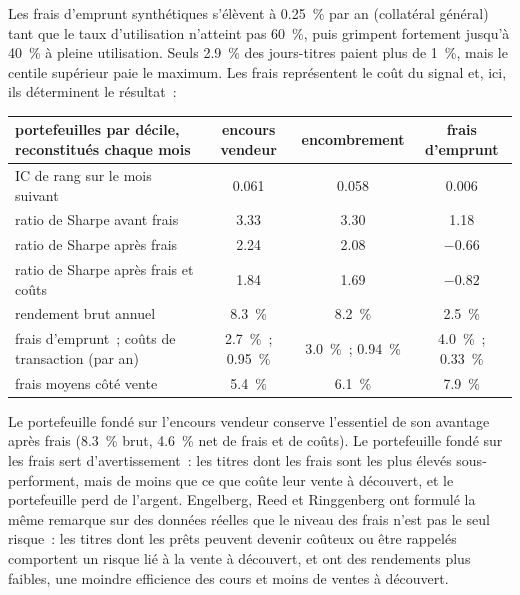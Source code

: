 Les frais d'emprunt synthétiques s'élèvent à 0.25~\% par an (collatéral général) tant que le taux d'utilisation n'atteint pas 60~\%, puis grimpent fortement jusqu'à 40~\% à pleine utilisation. Seuls 2.9~\% des
jours-titres paient plus de 1~\%, mais le centile supérieur paie le maximum. Les frais représentent le coût du signal et, ici, ils déterminent le résultat~:

\begin{center}
\small
\begin{tabular}{@{}lccc@{}}
\toprule
portefeuilles par décile, reconstitués chaque mois & encours vendeur & encombrement & frais d'emprunt\\
\midrule
IC de rang sur le mois suivant & 0.061 & 0.058 & 0.006\\
ratio de Sharpe avant frais & 3.33 & 3.30 & 1.18\\
ratio de Sharpe après frais & 2.24 & 2.08 & $-0.66$\\
ratio de Sharpe après frais et coûts & 1.84 & 1.69 & $-0.82$\\
rendement brut annuel & 8.3~\% & 8.2~\% & 2.5~\%\\
frais d'emprunt~; coûts de transaction (par an) & 2.7~\%~; 0.95~\% & 3.0~\%~; 0.94~\% & 4.0~\%~; 0.33~\%\\
frais moyens côté vente & 5.4~\% & 6.1~\% & 7.9~\%\\
\bottomrule
\end{tabular}
\end{center}

Le portefeuille fondé sur l'encours vendeur conserve l'essentiel de son avantage après frais (8.3~\% brut, 4.6~\% net de frais et de coûts). Le portefeuille fondé sur les frais sert d'avertissement~: les titres dont les frais sont les
plus élevés sous-performent, mais de moins que ce que coûte leur vente à découvert, et le portefeuille perd de l'argent. Engelberg, Reed et Ringgenberg ont formulé la même remarque sur des données réelles
que le niveau des frais n'est pas le seul risque~: les titres dont les prêts peuvent devenir coûteux ou être rappelés comportent un risque lié à la vente à découvert, et ont des rendements plus faibles, une moindre
efficience des cours et moins de ventes à découvert.

